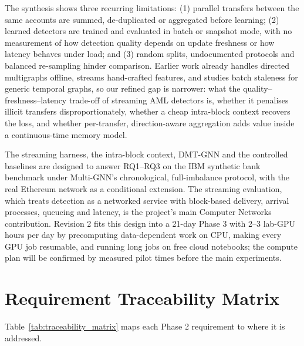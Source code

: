 \documentclass[11pt,a4paper]{article}
\begin{document}
The synthesis shows three recurring limitations: (1) parallel transfers between the same accounts are summed, de-duplicated or aggregated before learning; (2) learned detectors are trained and evaluated in batch or snapshot mode, with no measurement of how detection quality depends on update freshness or how latency behaves under load; and (3) random splits, undocumented protocols and balanced re-sampling hinder comparison. Earlier work already handles directed multigraphs offline, streams hand-crafted features, and studies batch staleness for generic temporal graphs, so our refined gap is narrower: what the quality--freshness--latency trade-off of streaming AML detectors is, whether it penalises illicit transfers disproportionately, whether a cheap intra-block context recovers the loss, and whether per-transfer, direction-aware aggregation adds value inside a continuous-time memory model.

The streaming harness, the intra-block context, DMT-GNN and the controlled baselines are designed to answer RQ1--RQ3 on the IBM synthetic bank benchmark under Multi-GNN's chronological, full-imbalance protocol, with the real Ethereum network as a conditional extension. The streaming evaluation, which treats detection as a networked service with block-based delivery, arrival processes, queueing and latency, is the project's main Computer Networks contribution. Revision 2 fits this design into a 21-day Phase 3 with 2--3 lab-GPU hours per day by precomputing data-dependent work on CPU, making every GPU job resumable, and running long jobs on free cloud notebooks; the compute plan will be confirmed by measured pilot times before the main experiments.

\appendix

\section{Requirement Traceability Matrix}
\label{app:traceability}

Table~\ref{tab:traceability_matrix} maps each Phase 2 requirement to where it is addressed.
\end{document}
